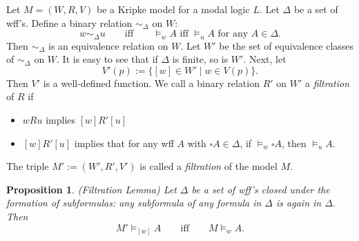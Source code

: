 \documentclass[12pt]{article}
\newtheorem{prop}{Proposition}
\begin{document}
Let $M=(W,R,V)$ be a Kripke model for a modal logic $L$.  Let $\Delta$ be a set of wff's.  Define a binary relation $\sim_{\Delta}$ on $W$: 
$$w \sim_{\Delta} u \qquad \mbox{iff} \qquad \models_w A \mbox{ iff } \models_u A \mbox{ for any }A\in \Delta.$$  
Then $\sim_{\Delta}$ is an equivalence relation on $W$.  Let $W'$ be the set of equivalence classes of $\sim_{\Delta}$ on $W$.  It is easy to see that if $\Delta$ is finite, so is $W'$.  Next, let $$V'(p):=\lbrace [w] \in W' \mid w\in V(p)\rbrace.$$  Then $V'$ is a well-defined function.  We call a binary relation $R'$ on $W'$ a \emph{filtration} of $R$ if
\begin{itemize}
\item $w R u$ implies $[w] R' [u]$
\item $[w] R' [u]$ implies that for any wff $A$ with $\square A \in \Delta$, if $\models_w \square A$, then $\models_u A$.
\end{itemize}
The triple $M':=(W',R',V')$ is called a \emph{filtration} of the model $M$.

\begin{prop} (Filtration Lemma) Let $\Delta$ be a set of wff's closed under the formation of subformulas: any subformula of any formula in $\Delta$ is again in $\Delta$.  Then $$M' \models_{[w]} A \qquad \mbox{iff} \qquad M \models_w A.$$ \end{prop}

\end{document}
